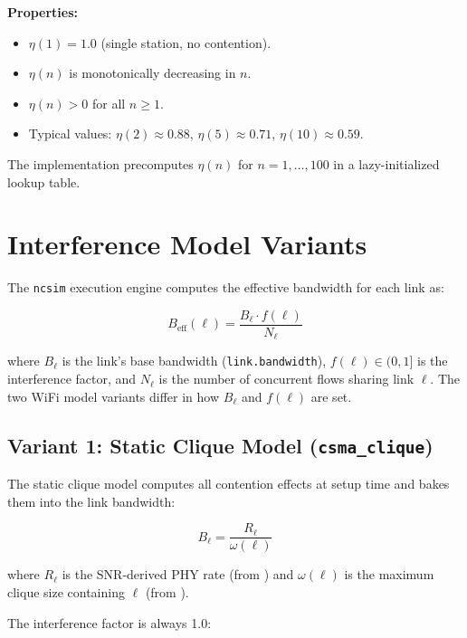 \documentclass[11pt,letterpaper]{article}
\newcommand{\ncsim}{\texttt{ncsim}}
\begin{document}
\textbf{Properties:}
\begin{itemize}[itemsep=2pt]
\item $\eta(1) = 1.0$ (single station, no contention).
\item $\eta(n)$ is monotonically decreasing in $n$.
\item $\eta(n) > 0$ for all $n \geq 1$.
\item Typical values: $\eta(2) \approx 0.88$, $\eta(5) \approx 0.71$,
  $\eta(10) \approx 0.59$.
\end{itemize}

The implementation precomputes $\eta(n)$ for $n = 1, \ldots, 100$ in a
lazy-initialized lookup table.

\section{Interference Model Variants}
\label{sec:interference}

The \ncsim{} execution engine computes the effective bandwidth for each link as:

\begin{equation}
\label{eq:engine}
B_\text{eff}(\ell) = \frac{B_\ell \cdot f(\ell)}{N_\ell}
\end{equation}

where $B_\ell$ is the link's base bandwidth (\texttt{link.bandwidth}),
$f(\ell) \in (0, 1]$ is the interference factor, and $N_\ell$ is the number
of concurrent flows sharing link $\ell$.  The two WiFi model variants differ
in how $B_\ell$ and $f(\ell)$ are set.

\subsection{Variant 1: Static Clique Model (\texttt{csma\_clique})}
\label{sec:clique_model}

The static clique model computes all contention effects at setup time and
bakes them into the link bandwidth:

\begin{equation}
\label{eq:clique_bw}
B_\ell = \frac{R_\ell}{\omega(\ell)}
\end{equation}

where $R_\ell$ is the SNR-derived PHY rate (from ) and
$\omega(\ell)$ is the maximum clique size containing $\ell$ (from
).

The interference factor is always 1.0:
\end{document}
